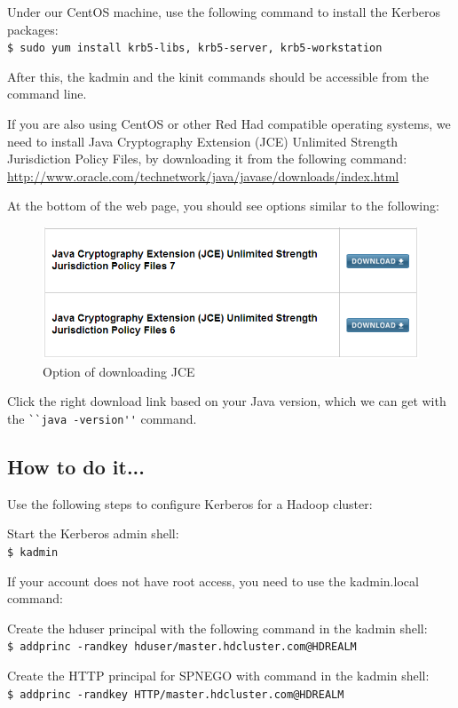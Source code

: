 Under our CentOS machine, use the following command to install the Kerberos packages: \\
\verb|$ sudo yum install krb5-libs, krb5-server, krb5-workstation|

After this, the kadmin and the kinit commands should be accessible from the command line.

If you are also using CentOS or other Red Had compatible operating systems, we need to install Java Cryptography Extension (JCE) Unlimited Strength Jurisdiction Policy Files, by downloading it from the following command: \url{http://www.oracle.com/technetwork/java/javase/downloads/index.html}

At the bottom of the web page, you should see options similar to the following:
\begin{figure}[ht]
  \centering
  \includegraphics[width=\textwidth]{figs/5163os_05_01.png}
  \caption{Option of downloading JCE}\label{fig:jce}
\end{figure} 
Click the right download link based on your Java version, which we can get with the \verb|``java -version''| command.
\subsection*{How to do it...}
Use the following steps to configure Kerberos for a Hadoop cluster:

Start the Kerberos admin shell: \\
\verb|$ kadmin|

If your account does not have root access, you need to use the kadmin.local command:

Create the hduser principal with the following command in the kadmin shell: \\
\verb|$ addprinc -randkey hduser/master.hdcluster.com@HDREALM|

Create the HTTP principal for SPNEGO with command in the kadmin shell: \\
\verb|$ addprinc -randkey HTTP/master.hdcluster.com@HDREALM|

